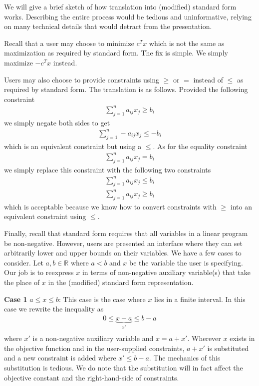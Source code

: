 \documentclass{article}
\begin{document}
We will give a brief sketch of how translation into (modified) standard form works. Describing the entire process would be tedious and uninformative, relying on many technical details that would detract from the presentation. 

Recall that a user may choose to minimize $c^T x$ which is not the same as maximization as required by standard form. The fix is simple. We simply maximize $-c^T x$ instead.

Users may also choose to provide constraints using $\geq$ or $=$ instead of $\leq$ as required by standard form. The translation is as follows. Provided the following constraint
\begin{align*}
    \sum_{j=1}^n a_{ij} x_{j} \geq b_i
\end{align*}
we simply negate both sides to get
\begin{align*}
    \sum_{j=1}^n -a_{ij} x_{j} \leq -b_i
\end{align*}
which is an equivalent constraint but using a $\leq$. As for the equality constraint
\begin{align*}
    \sum_{j=1}^n a_{ij} x_{j} = b_i
\end{align*}
we simply replace this constraint with the following two constraints
\begin{align*}
    \sum_{j=1}^n a_{ij} x_{j} \leq b_i \\
    \sum_{j=1}^n a_{ij} x_{j} \geq b_i
\end{align*}
which is acceptable because we know how to convert constraints with $\geq$ into an equivalent constraint using $\leq$.

Finally, recall that standard form requires that all variables in a linear program be non-negative. However, users are presented an interface where they can set arbitrarily lower and upper bounds on their variables. We have a few cases to consider. Let $a, b \in \mathbb{R}$ where $a < b$ and $x$ be the variable the user is specifying. Our job is to reexpress $x$ in terms of non-negative auxiliary variable(s) that take the place of $x$ in the (modified) standard form representation.

\textbf{Case 1 } $a \leq x \leq b$: This case is the case where $x$ lies in a finite interval. In this case we rewrite the inequality as 
\begin{align*}
    0 \leq \underbrace{x - a}_{x'} \leq b - a \\
\end{align*}
where $x'$ is a non-negative auxiliary variable and $x = a + x'$. Wherever $x$ exists in the objective function and in the user-supplied constraints, $a + x'$ is substituted and a new constraint is added where $x' \leq b - a$. The mechanics of this substitution is tedious. We do note that the substitution will in fact affect the objective constant and the right-hand-side of constraints.
\end{document}
